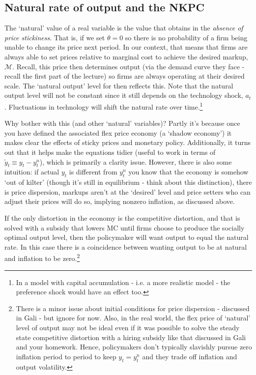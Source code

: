 \documentclass[authoryear,11pt]{elsarticle}
\begin{document}
\subsection{Natural rate of output and the NKPC}
The `natural' value of a real variable is the value that obtains in the \textit{absence of price stickiness}. That is, if we set $\theta=0$ so there is no probability of a firm being unable to change its price next period. In our context, that means that firms are always able to set prices relative to marginal cost to achieve the desired markup, $\mathcal{M}$. Recall, this price then determines output (via the demand curve they face - recall the first part of the lecture) so firms are always operating at their desired scale. The `natural output' level for then reflects this. Note that the natural output level will not be constant since it still depends on the technology shock, $a_{t}$. Fluctuations in technology will shift the natural rate over time.\footnote{In a model with capital accumulation - i.e. a more realistic model - the preference shock would have an effect too.}

Why bother with this (and other `natural' variables)? Partly it's because once you have defined the associated flex price economy (a `shadow economy') it makes clear the effects of sticky prices and monetary policy. Additionally, it turns out that it helps make the equations tidier (useful to work in terms of $\tilde{y}_{t}\equiv y_{t}-y_{t}^{n}$), which is primarily a clarity issue. However, there is also some intuition: if actual $y_{t}$ is different from $y_{t}^{n}$ you know that the economy is somehow `out of kilter' (though it's still in equilibrium - think about this distinction), there is price dispersion, markups aren't at the `desired' level and price setters who can adjust their prices will do so, implying nonzero inflation, as discussed above.

If the only distortion in the economy is the competitive distortion, and that is solved with a subsidy that lowers MC until firms choose to produce the socially optimal output level, then the policymaker will want output to equal the natural rate. In this case there is a coincidence between wanting output to be at natural and inflation to be zero.\footnote{There is a minor issue about initial conditions for price dispersion - discussed in Gali - but ignore for now. Also, in the real world, the flex price of `natural' level of output may not be ideal even if it was possible to solve the steady state competitive distortion with a hiring subsidy like that discussed in Gali and your homework. Hence, policymakers don't typically slavishly pursue zero inflation period to period to keep $y_{t}=y^{n}_{t}$ and they trade off inflation and output volatility.}
\end{document}
